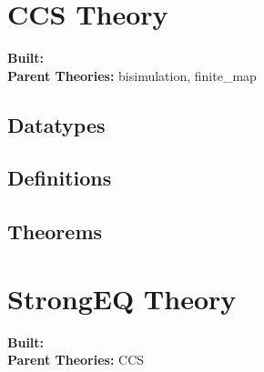 \documentclass[11pt, twoside]{article}
\begin{document}

















\tableofcontents
\cleardoublepage
\HOLpagestyle

\section{CCS Theory}
\begin{flushleft}
\textbf{Built:} \HOLCCSDate \\[2pt]
\textbf{Parent Theories:} bisimulation, finite_map
\end{flushleft}

\subsection{Datatypes}

\HOLCCSDatatypes

\subsection{Definitions}

\HOLCCSDefinitions

\subsection{Theorems}

\HOLCCSTheorems

\section{StrongEQ Theory}
\begin{flushleft}
\textbf{Built:} \HOLStrongEQDate \\[2pt]
\textbf{Parent Theories:} CCS
\end{flushleft}
\end{document}
